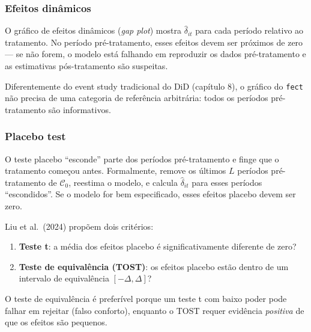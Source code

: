 \documentclass[
]{article}
\providecommand{\tightlist}{%
  \setlength{\itemsep}{0pt}\setlength{\parskip}{0pt}}
\begin{document}
\subsubsection{Efeitos dinâmicos}\label{efeitos-dinuxe2micos}

O gráfico de efeitos dinâmicos (\emph{gap plot}) mostra \(\hat{\delta}_{it}\) para cada período relativo ao tratamento. No período pré-tratamento, esses efeitos devem ser próximos de zero --- se não forem, o modelo está falhando em reproduzir os dados pré-tratamento e as estimativas pós-tratamento são suspeitas.

Diferentemente do event study tradicional do DiD (capítulo 8), o gráfico do \texttt{fect} não precisa de uma categoria de referência arbitrária: todos os períodos pré-tratamento são informativos.

\subsubsection{Placebo test}\label{placebo-test}

O teste placebo ``esconde'' parte dos períodos pré-tratamento e finge que o tratamento começou antes. Formalmente, remove os últimos \(L\) períodos pré-tratamento de \(\mathcal{C}_0\), reestima o modelo, e calcula \(\hat{\delta}_{it}\) para esses períodos ``escondidos''. Se o modelo for bem especificado, esses efeitos placebo devem ser zero.

Liu et al.~(2024) propõem dois critérios:

\begin{enumerate}
\def\labelenumi{\arabic{enumi}.}
\tightlist
\item
  \textbf{Teste t}: a média dos efeitos placebo é significativamente diferente de zero?
\item
  \textbf{Teste de equivalência (TOST)}: os efeitos placebo estão dentro de um intervalo de equivalência \([-\Delta, \Delta]\)?
\end{enumerate}

O teste de equivalência é preferível porque um teste t com baixo poder pode falhar em rejeitar (falso conforto), enquanto o TOST requer evidência \emph{positiva} de que os efeitos são pequenos.
\end{document}
